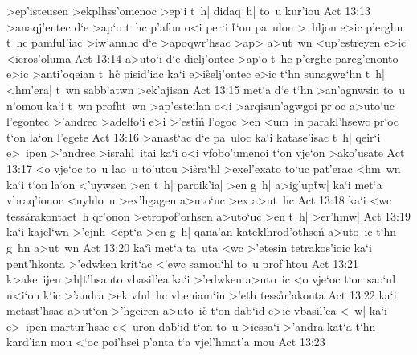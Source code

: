 >ep'isteusen
>ekplhss'omenoc
>ep`i
t~h|
didaq~h|
to~u
kur'iou\bibvsend
\vs Act 13:13
>anaqj'entec
d`e
>ap`o
t~hc
p'afou
o<i
per`i
\r{t}`on
pa~ulon
>~hljon
e>ic
p'erghn
t~hc
pamful'iac
>iw'annhc
d`e
>apoqwr'hsac
>ap>
a>ut~wn
<up'estreyen
e>ic
<ieros'oluma\bibvsend
\vs Act 13:14
a>uto`i
d`e
dielj'ontec
>ap`o
t~hc
p'erghc
pareg'enonto
e>ic
>anti'oqeian
t~hc\r{}
pisid'iac
ka`i
e>i\r{s}elj'ontec
e>ic
t`hn
sunagwg`hn
t~h|
<hm'era|
t~wn
sabb'atwn
>ek'ajisan\bibvsend
\vs Act 13:15
met`a
d`e
t`hn
>an'agnwsin
to~u
n'omou
ka`i
t~wn
profht~wn
>ap'esteilan
o<i
>arqisun'agwgoi
pr`oc
a>uto`uc
l'egontec
>'andrec
>adelfo`i
e>i
>'estin\r{}
l'ogoc
>en
<um~in
parakl'hsewc
pr`oc
t`on
la`on
l'egete\bibvsend
\vs Act 13:16
>anast`ac
d`e
pa~uloc
ka`i
katase'isac
t~h|
qeir`i
e>~ipen
>'andrec
>israhl~itai
ka`i
o<i
vfobo'umenoi
t`on
vje`on
>ako'usate\bibvsend
\vs Act 13:17
<o
vje`oc
to~u
lao~u
to'utou
>i\r{s}ra`hl
>exel'exato
to`uc
pat'erac
<hm~wn
ka`i
t`on
la`on
<'uywsen
>en
t~h|
paroik'ia|
>en
g~h|
a>ig'up\r{t}w|
ka`i
met`a
vbraq'ionoc
<uyhlo~u
>ex'hgagen
a>uto`uc
>ex
a>ut~hc\bibvsend
\vs Act 13:18
ka`i
<wc
tess\r{a}rakontaet~h
qr'onon
>etropof'orhsen
a>uto`uc
>en
t~h|
>er'hmw|\bibvsend
\vs Act 13:19
ka`i
kajel`wn
>'ejnh
<ept`a
>en
g~h|
qana'an
kateklhrod'othsen\r{}
a>uto~ic
t`hn
g~hn
a>ut~wn\bibvsend
\vs Act 13:20
ka`i\r{}
met`a
ta~uta
<wc
>'etesin
tetrakos'ioic
ka`i
pent'hkonta
>'edwken
krit`ac
<'ewc
samou`hl
to~u
prof'htou\bibvsend
\vs Act 13:21
k>ake~ijen
>h|t'hsanto
vbasil'ea
ka`i
>'edwken
a>uto~ic
<o
vje`oc
t`on
sao`ul
u<i`on
k`ic
>'andra
>ek
vful~hc
vbeniam`in
>'eth
tess\r{a}r'akonta\bibvsend
{}
\vs Act 13:22
ka`i
metast'hsac
a>ut`on
>'hgeiren
a>uto~ic\r{}
t`on
dab`id
e>ic
vbasil'ea
<~w|
ka`i
e>~ipen
martur'hsac
e<~uron
da\r{b}`id
t`on
to~u
>iessa`i
>'andra
kat`a
t`hn
kard'ian
mou
<`oc
poi'hsei
p'anta
t`a
vjel'hmat'a
mou\bibvsend
\vs Act 13:23
